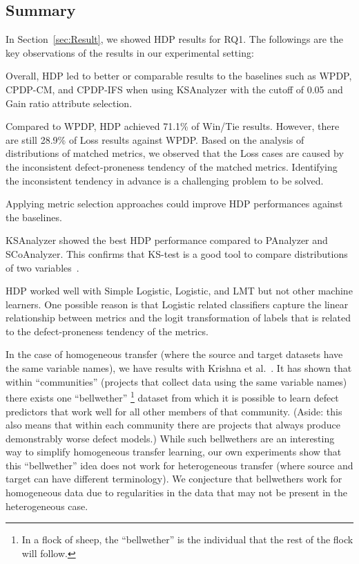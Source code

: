 \subsection{Summary}
In Section~\ref{sec:Result}, we showed HDP results for RQ1. The followings are the key observations of the results in our experimental setting:
\squishlist
    \item Overall, HDP led to better or comparable results to the baselines such as WPDP, CPDP-CM, and CPDP-IFS when using KSAnalyzer with the cutoff of 0.05 and Gain ratio attribute selection.
    \item Compared to WPDP, HDP achieved 71.1\% of Win/Tie results. However, there are still 28.9\% of Loss results against WPDP. Based on the analysis of distributions of matched metrics, we observed that the Loss cases are caused by the inconsistent defect-proneness tendency of the matched metrics. Identifying the inconsistent tendency in advance is a challenging problem to be solved.
    \item Applying metric selection approaches could improve HDP performances against the baselines.
    \item KSAnalyzer showed the best HDP performance compared to PAnalyzer and SCoAnalyzer. This confirms that KS-test is a good tool to compare distributions of two variables~\cite{Lilliefors67,Massey51}.
    \item HDP worked well with Simple Logistic, Logistic, and LMT but not other machine learners. One possible reason is that Logistic related classifiers capture the linear relationship between metrics and the logit transformation of labels that is related to the defect-proneness tendency of the metrics.
\squishend

In the case of homogeneous transfer (where the source and target datasets have the same variable names), we have results with Krishna et al.~\cite{krishna16}. It has shown that within ``communities'' (projects that collect data using the same variable names) there exists one ``bellwether'' \footnote{In a flock of sheep, the ``bellwether'' is the individual that the rest of the flock will follow.} dataset from which it is possible to learn defect predictors that work well for all other members of that community. (Aside: this also means that within each community there are projects that always produce demonstrably worse defect models.) While such bellwethers are an interesting way to simplify homogeneous transfer learning, our own experiments show that this ``bellwether'' idea does not work for heterogeneous transfer (where source and target can have different terminology). We conjecture that bellwethers work for homogeneous data due to regularities in the data that may not be present in the heterogeneous case.
